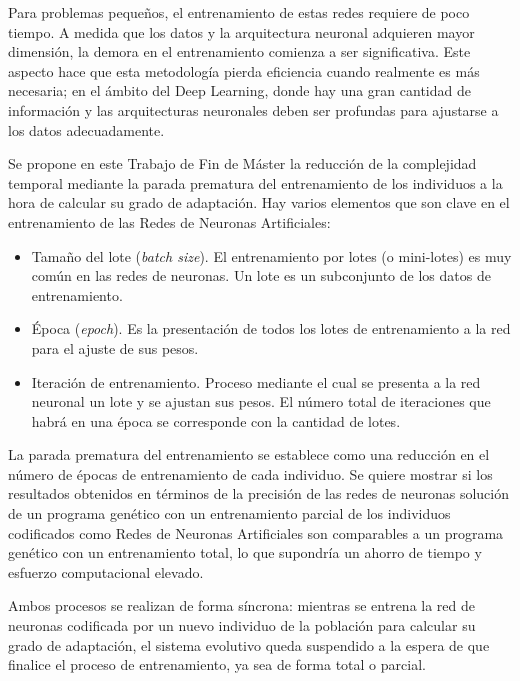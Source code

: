 \documentclass[spanish,a4paper,12pt,twoside]{report}
\begin{document}
  Para problemas pequeños, el entrenamiento de estas redes requiere de poco tiempo. A medida que los datos y la arquitectura neuronal adquieren mayor dimensión, la demora en el entrenamiento comienza a ser significativa. Este aspecto hace que esta metodología pierda eficiencia cuando realmente es más necesaria; en el ámbito del Deep Learning, donde hay una gran cantidad de información y las arquitecturas neuronales deben ser profundas para ajustarse a los datos adecuadamente. \par
  Se propone en este Trabajo de Fin de Máster la reducción de la complejidad temporal mediante la parada prematura del entrenamiento de los individuos a la hora de calcular su grado de adaptación. Hay varios elementos que son clave en el entrenamiento de las Redes de Neuronas Artificiales: \par
  \begin{itemize}
    \item Tamaño del lote (\emph{batch size}). El entrenamiento por lotes (o mini-lotes) es muy común en las redes de neuronas. Un lote es un subconjunto de los datos de entrenamiento.
    \item Época (\emph{epoch}). Es la presentación de todos los lotes de entrenamiento a la red para el ajuste de sus pesos.
    \item Iteración de entrenamiento. Proceso mediante el cual se presenta a la red neuronal un lote y se ajustan sus pesos. El número total de iteraciones que habrá en una época se corresponde con la cantidad de lotes.
  \end{itemize} \par
  La parada prematura del entrenamiento se establece como una reducción en el número de épocas de entrenamiento de cada individuo. Se quiere mostrar si los resultados obtenidos en términos de la precisión de las redes de neuronas solución de un programa genético con un entrenamiento parcial de los individuos codificados como Redes de Neuronas Artificiales son comparables a un programa genético con un entrenamiento total, lo que supondría un ahorro de tiempo y esfuerzo computacional elevado. \par
  Ambos procesos se realizan de forma síncrona: mientras se entrena la red de neuronas codificada por un nuevo individuo de la población para calcular su grado de adaptación, el sistema evolutivo queda suspendido a la espera de que finalice el proceso de entrenamiento, ya sea de forma total o parcial.
    
\end{document}
